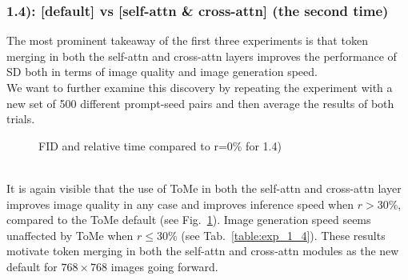 \subsubsection*{1.4): [default] vs [self-attn \& cross-attn] (the second time)}
The most prominent takeaway of the first three experiments is that token merging in both the self-attn and cross-attn layers improves the performance of SD both in terms of image quality and image generation speed.\\
We want to further examine this discovery by repeating the experiment with a new set of 500 different prompt-seed pairs and then average the results of both trials.
\begin{figure}[!htb]
    
    
\caption{FID and relative time compared to r=0\% for 1.4)}
\label{fig:exp_1_4}
\end{figure}\\
It is again visible that the use of ToMe in both the self-attn and cross-attn layer improves image quality in any case and improves inference speed when \(r > 30\%\), compared to the ToMe default (see Fig.~\ref{fig:exp_1_4}). Image generation speed seems unaffected by ToMe when \(r \leq 30\%\) (see Tab.~\ref{table:exp_1_4}).
These results motivate token merging in both the self-attn and cross-attn modules as the new default for $768 \times 768$ images going forward.
